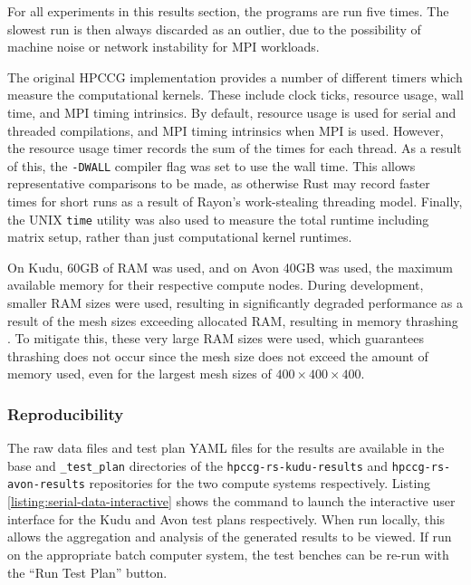 For all experiments in this results section, the programs are run five times. The slowest run is then always discarded as an outlier, due to the possibility of machine noise or network instability for MPI workloads.

The original HPCCG implementation provides a number of different timers which measure the computational kernels. These include clock ticks, resource usage, wall time, and MPI timing intrinsics. By default, resource usage is used for serial and threaded compilations, and MPI timing intrinsics when MPI is used. However, the resource usage timer records the sum of the times for each thread. As a result of this, the \texttt{-DWALL} compiler flag was set to use the wall time. This allows representative comparisons to be made, as otherwise Rust may record faster times for short runs as a result of Rayon's work-stealing threading model. Finally, the UNIX \texttt{time} utility was also used to measure the total runtime including matrix setup, rather than just computational kernel runtimes.

On Kudu, 60GB of RAM was used, and on Avon 40GB was used, the maximum available memory for their respective compute nodes. During development, smaller RAM sizes were used, resulting in significantly degraded performance as a result of the mesh sizes exceeding allocated RAM, resulting in memory thrashing \cite{pattersonHennessyComputerOrganisationArchitecture}. To mitigate this, these very large RAM sizes were used, which guarantees thrashing does not occur since the mesh size does not exceed the amount of memory used, even for the largest mesh sizes of $400 \times 400 \times 400$.


\subsubsection{Reproducibility}
\label{sssec:parallelism-approaches-reproducibility}

The raw data files and test plan YAML files for the results are available in the base and \texttt{\_test\_plan} directories of the \texttt{hpccg-rs-kudu-results} and \texttt{hpccg-rs-avon-results} repositories for the two compute systems respectively. Listing \ref{listing:serial-data-interactive} shows the command to launch the interactive user interface for the Kudu and Avon test plans respectively. When run locally, this allows the aggregation and analysis of the generated results to be viewed. If run on the appropriate batch computer system, the test benches can be re-run with the ``Run Test Plan'' button.

